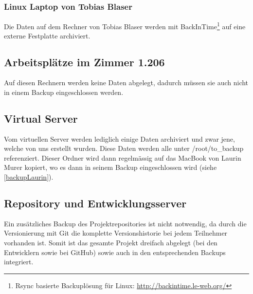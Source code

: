 			\subsubsection{Linux Laptop von Tobias Blaser}
				Die Daten auf dem Rechner von Tobias Blaser werden mit BackInTime\footnote{Rsync basierte Backuplösung für Linux: \url{http://backintime.le-web.org/}} auf eine externe Festplatte archiviert.
				
				
		\subsection{Arbeitsplätze im Zimmer 1.206}
			Auf diesen Rechnern werden keine Daten abgelegt, dadurch müssen sie auch nicht in einem Backup eingeschlossen werden.


		\subsection{Virtual Server}
			Vom virtuellen Server werden lediglich einige Daten archiviert und zwar jene, welche von uns erstellt wurden.
			Diese Daten werden alle unter /root/to\_backup referenziert.
			Dieser Ordner wird dann regelmässig auf das MacBook von Laurin Murer kopiert, wo es dann in seinem Backup eingeschlossen wird (siehe \ref{backupLaurin}).
		
		
		\subsection{Repository und Entwicklungsserver}
		\label{subsec:vagrant}
			Ein zusätzliches Backup des Projektrepositories ist nicht notwendig, da durch die Versionierung mit Git die komplette Versionshistorie bei jedem Teilnehmer vorhanden ist.
			Somit ist das gesamte Projekt dreifach abgelegt (bei den Entwicklern sowie bei GitHub) sowie auch in den entsprechenden Backups integriert.


